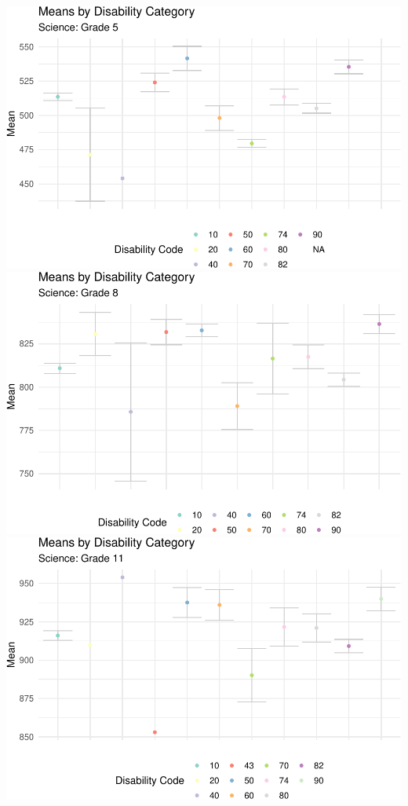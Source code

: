 \documentclass[]{article}
\begin{document}
\includegraphics{Critical_Element_4_files/figure-latex/sci_plots5811-1.pdf}
\includegraphics{Critical_Element_4_files/figure-latex/sci_plots5811-2.pdf}
\includegraphics{Critical_Element_4_files/figure-latex/sci_plots5811-3.pdf}
\end{document}
